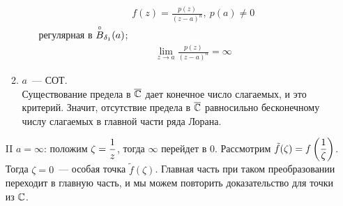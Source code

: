 \begin{itemize}
\begin{enumerate}
\begin{itemize}
\begin{align*}
              & f(z) = \frac{p(z)}{(z-a)^n}, \ p(a) \neq 0
            \end{align*}
            регулярная в $\overset{\circ}{B}_{\delta_1}(a)$;
            \begin{align*}
              & \lim_{z \to a} \frac{p(z)}{(z-a)^n} = \infty
            \end{align*}         
        \end{itemize}
        \item $a$~--- СОТ.
        \\
        Существование предела в $\overline{\mathbb{C}}$ дает конечное число слагаемых, и это
        критерий. Значит, отсутствие предела в $\overline{\mathbb{C}}$ равносильно бесконечному
        числу слагаемых в главной части ряда Лорана.
        \end{enumerate}
    \item[II] $a = \infty$: положим $\zeta = \displaystyle \frac{1}{z}$, тогда $\infty$
    перейдет в $0$. Рассмотрим $\tilde{f}(\zeta) = f\left( \displaystyle \frac{1}{\zeta}
    \right)$. Тогда $\zeta = 0$~--- особая точка $\tilde{f}(\zeta)$. Главная
    часть при таком преобразовании переходит в главную часть, и мы можем
    повторить доказательство для точки из $\mathbb{C}$.
\end{itemize} 